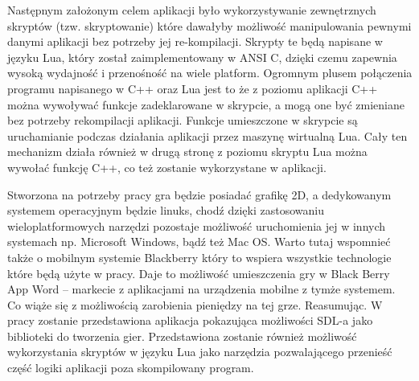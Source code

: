 Następnym założonym celem aplikacji było wykorzystywanie zewnętrznych skryptów (tzw. skryptowanie) które dawałyby możliwość manipulowania pewnymi danymi aplikacji bez potrzeby jej re-kompilacji. Skrypty te będą napisane w języku Lua, który został zaimplementowany w ANSI C, dzięki czemu zapewnia wysoką wydajność i przenośność na wiele platform. Ogromnym plusem połączenia programu napisanego w C++ oraz Lua jest to że z poziomu aplikacji C++ można wywoływać funkcje zadeklarowane w skrypcie, a mogą one być zmieniane bez potrzeby rekompilacji aplikacji. Funkcje umieszczone w skrypcie są uruchamianie podczas działania aplikacji przez maszynę wirtualną Lua. Cały ten mechanizm działa również w drugą stronę z poziomu skryptu Lua można wywołać funkcję C++, co też zostanie wykorzystane w aplikacji.

Stworzona na potrzeby pracy gra będzie posiadać grafikę 2D, a dedykowanym systemem operacyjnym będzie linuks, chodź dzięki zastosowaniu wieloplatformowych narzędzi pozostaje możliwość uruchomienia jej w innych systemach np. Microsoft Windows, bądź też Mac OS. Warto tutaj wspomnieć także o mobilnym systemie Blackberry  który to wspiera wszystkie technologie które będą użyte w pracy. Daje to możliwość umieszczenia gry w Black Berry App Word – markecie z aplikacjami na urządzenia mobilne z tymże systemem. Co wiąże się z możliwością zarobienia pieniędzy na tej grze. Reasumując. W pracy zostanie przedstawiona aplikacja pokazująca możliwości SDL-a jako biblioteki do tworzenia gier. Przedstawiona zostanie również możliwość wykorzystania skryptów w języku Lua jako narzędzia pozwalającego przenieść część logiki aplikacji poza skompilowany
program.

